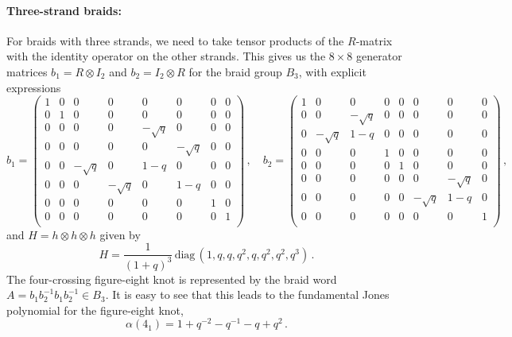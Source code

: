 \documentclass[11pt]{article}
\begin{document}
\paragraph{Three-strand braids:} For braids with three strands, we need to take tensor products of the $R$-matrix with the identity operator on the other strands. This gives us the $8\times8$ generator matrices $b_1 = R \otimes I_{2}$ and $b_2 = I_{2} \otimes R$ for the braid group $B_3$, with explicit expressions
\begin{equation}
	b_{1}=\left(
	\begin{array}{cccccccc}
	 1 & 0 & 0 & 0 & 0 & 0 & 0 & 0 \\
	 0 & 1 & 0 & 0 & 0 & 0 & 0 & 0 \\
	 0 & 0 & 0 & 0 & -\sqrt{q} & 0 & 0 & 0 \\
	 0 & 0 & 0 & 0 & 0 & -\sqrt{q} & 0 & 0 \\
	 0 & 0 & -\sqrt{q} & 0 & 1-q & 0 & 0 & 0 \\
	 0 & 0 & 0 & -\sqrt{q} & 0 & 1-q & 0 & 0 \\
	 0 & 0 & 0 & 0 & 0 & 0 & 1 & 0 \\
	 0 & 0 & 0 & 0 & 0 & 0 & 0 & 1 \\
	\end{array}
	\right)\,,\quad
	b_{2}= \left(
	\begin{array}{cccccccc}
	 1 & 0 & 0 & 0 & 0 & 0 & 0 & 0 \\
	 0 & 0 & -\sqrt{q} & 0 & 0 & 0 & 0 & 0 \\
	 0 & -\sqrt{q} & 1-q & 0 & 0 & 0 & 0 & 0 \\
	 0 & 0 & 0 & 1 & 0 & 0 & 0 & 0 \\
	 0 & 0 & 0 & 0 & 1 & 0 & 0 & 0 \\
	 0 & 0 & 0 & 0 & 0 & 0 & -\sqrt{q} & 0 \\
	 0 & 0 & 0 & 0 & 0 & -\sqrt{q} & 1-q & 0 \\
	 0 & 0 & 0 & 0 & 0 & 0 & 0 & 1 \\
	\end{array}
	\right)\,,
\end{equation}
and $H = h \otimes h \otimes h$ given by
\begin{equation}
	H = \frac1{(1+q)^3}\,\text{diag}\,(1,q,q,q^2,q,q^2,q^2,q^3)\,.
\end{equation}
The four-crossing figure-eight knot is represented by the braid word $A = b_1 b_2^{-1} b_1 b_2^{-1}\in B_3$.
It is easy to see that this leads to the fundamental Jones polynomial for the figure-eight knot,
\begin{equation} 
\alpha(4_1)=1+q^{-2}-q^{-1}-q+q^2\,.
\end{equation}
\end{document}
